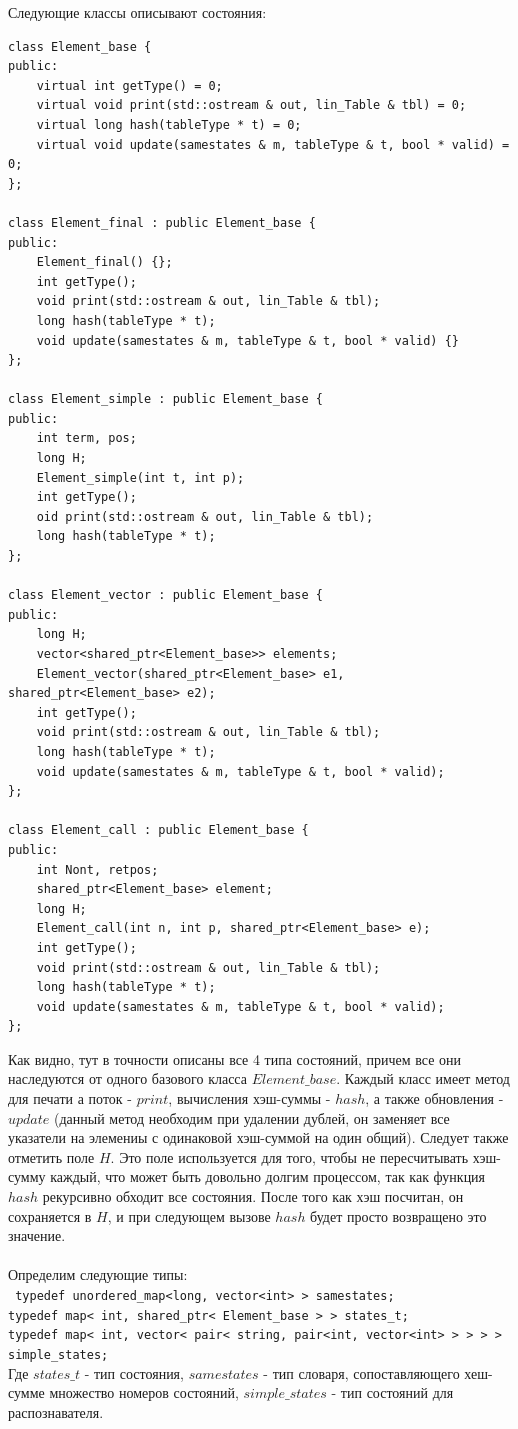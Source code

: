 \documentclass[12pt]{article}
\begin{document}
Следующие классы описывают состояния:
\begin{verbatim}
class Element_base {
public:
    virtual int getType() = 0;
    virtual void print(std::ostream & out, lin_Table & tbl) = 0;
    virtual long hash(tableType * t) = 0;
    virtual void update(samestates & m, tableType & t, bool * valid) = 0;
};

class Element_final : public Element_base {
public:
    Element_final() {};
    int getType();
    void print(std::ostream & out, lin_Table & tbl);
    long hash(tableType * t);
    void update(samestates & m, tableType & t, bool * valid) {}
};

class Element_simple : public Element_base {
public:
    int term, pos;
    long H;
    Element_simple(int t, int p);
    int getType();
    oid print(std::ostream & out, lin_Table & tbl);
    long hash(tableType * t);
};

class Element_vector : public Element_base {
public:
    long H;
    vector<shared_ptr<Element_base>> elements;
    Element_vector(shared_ptr<Element_base> e1, shared_ptr<Element_base> e2);
    int getType();
    void print(std::ostream & out, lin_Table & tbl);
    long hash(tableType * t);
    void update(samestates & m, tableType & t, bool * valid);
};

class Element_call : public Element_base {
public:
    int Nont, retpos;
    shared_ptr<Element_base> element;
    long H;
    Element_call(int n, int p, shared_ptr<Element_base> e);
    int getType();
    void print(std::ostream & out, lin_Table & tbl);
    long hash(tableType * t);
    void update(samestates & m, tableType & t, bool * valid);
};
\end{verbatim}

Как видно, тут в точности описаны все 4 типа состояний, причем все они наследуются от одного базового класса $Element\_base$. Каждый класс имеет метод для печати а поток - $print$, вычисления хэш-суммы - $hash$, а также обновления - $update$ (данный метод необходим при удалении дублей, он заменяет все указатели на элемениы с одинаковой хэш-суммой на один общий). Следует также отметить поле $H$. Это поле используется для того, чтобы не пересчитывать хэш-сумму каждый, что может быть довольно долгим процессом, так как функция $hash$ рекурсивно обходит все состояния. После того как хэш посчитан, он сохраняется в $H$, и при следующем вызове $hash$ будет просто возвращено это значение.\\\\ 

Определим следующие типы:\\
\texttt{
typedef unordered\_map<long, vector<int> > samestates;\\
typedef map< int, shared\_ptr< Element\_base > > states\_t;\\
typedef map< int, vector< pair< string, pair<int, vector<int> > > > > simple\_states;\\}Где $states\_t$ - тип состояния, $samestates$ - тип словаря, сопоставляющего хеш-сумме множество номеров состояний, $simple\_states$ - тип состояний для распознавателя.\\
\\
\end{document}
